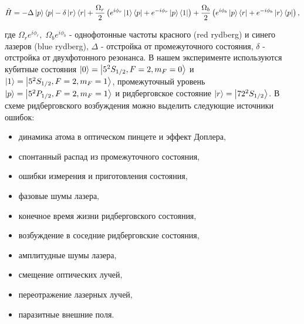 \begin{equation}
	\hat{H}=-\Delta\left| p \right\rangle\left\langle p \right|-\delta\left| r \right\rangle\left\langle r \right|+\frac{\Omega_r}{2}\left(e^{i\phi_r}\left| 1 \right\rangle\left\langle p \right|+e^{-i\phi_r}\left| p \right\rangle\left\langle 1 \right|\right)+\frac{\Omega_b}{2}\left(e^{i\phi_b}\left| p \right\rangle\left\langle r \right|+e^{-i\phi_b}\left| r \right\rangle\left\langle p \right|\right),
	\label{eq:ham_twophoton}
\end{equation}

где $\Omega_{r}e^{i\phi_r}, \; \Omega_{b}e^{i\phi_b}$ - однофотонные частоты красного (red rydberg) и синего лазеров (blue rydberg), $\Delta$ - отстройка от промежуточного состояния, $\delta$ - отстройка от двухфотонного резонанса. В нашем эксперименте используются кубитные состояния $\left| 0 \right\rangle = \left| 5^2S_{1/2},F=2,m_F=0 \right\rangle$ и $\left| 1 \right\rangle = \left| 5^2S_{1/2},F=2,m_F=1 \right\rangle$, промежуточный уровень $\left| p \right\rangle = \left| 5^2P_{1/2},F=2,m_F=1 \right\rangle$ и ридберговское состояние $\left| r \right\rangle=\left| {72}^2S_{1/2} \right\rangle$. В схеме ридберговского возбуждения можно выделить следующие источники ошибок:  


\begin{itemize}
	\item динамика атома в оптическом пинцете и эффект Доплера,
	\item спонтанный распад из промежуточного состояния, 
	\item ошибки измерения и приготовления состояния,
	\item фазовые шумы лазера, 
	\item конечное время жизни ридберговского состояния,
	\item возбуждение в соседние ридберговские состояния,
	\item амплитудные шумы лазера,
	\item смещение оптических лучей, 
	\item переотражение лазерных лучей, 
	\item паразитные внешние поля.
\end{itemize}

